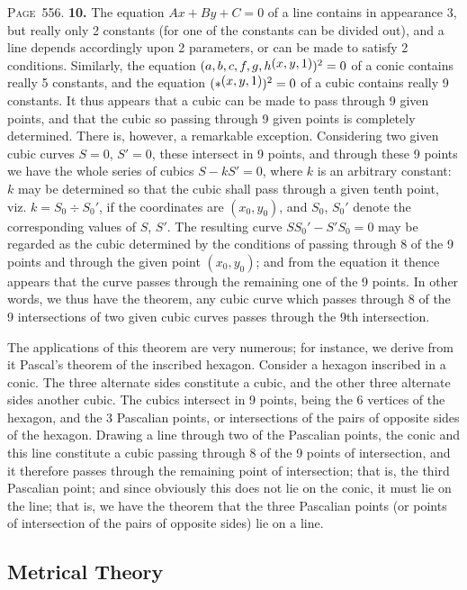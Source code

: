 \documentclass[11pt,a4paper]{book}
\begin{document}
\newpage
\noindent\textsc{Page~556.} \textbf{10.} The equation $Ax+By+C=0$ of a line contains in appearance 3, but really only 2 constants (for one of the constants can be divided out), and a line depends accordingly upon 2 parameters, or can be made to satisfy 2 conditions. Similarly, the equation $(a,b,c,f,g,h\,\raisebox{0.5ex}{\text{$\!(x,y,1)$}})^2=0$ of a conic contains really 5 constants, and the equation $(*\,\raisebox{0.5ex}{\text{$\!(x,y,1)$}})^2=0$ of a cubic contains really 9 constants. It thus appears that a cubic can be made to pass through 9 given points, and that the cubic so passing through 9 given points is completely determined. There is, however, a remarkable exception. Considering two given cubic curves $S=0$, $S'=0$, these intersect in 9 points, and through these 9 points we have the whole series of cubics $S-kS'=0$, where $k$ is an arbitrary constant: $k$ may be determined so that the cubic shall pass through a given tenth point, viz. $k=S_0\div S_0'$, if the coordinates are $(x_0,y_0)$, and $S_0$, $S_0'$ denote the corresponding values of $S$, $S'$. The resulting curve $SS_0'-S'S_0=0$ may be regarded as the cubic determined by the conditions of passing through 8 of the 9 points and through the given point $(x_0,y_0)$; and from the equation it thence appears that the curve passes through the remaining one of the 9 points. In other words, we thus have the theorem, any cubic curve which passes through 8 of the 9 intersections of two given cubic curves passes through the 9th intersection.

The applications of this theorem are very numerous; for instance, we derive from it Pascal's theorem of the inscribed hexagon. Consider a hexagon inscribed in a conic. The three alternate sides constitute a cubic, and the other three alternate sides another cubic. The cubics intersect in 9 points, being the 6 vertices of the hexagon, and the 3 Pascalian points, or intersections of the pairs of opposite sides of the hexagon. Drawing a line through two of the Pascalian points, the conic and this line constitute a cubic passing through 8 of the 9 points of intersection, and it therefore passes through the remaining point of intersection; that is, the third Pascalian point; and since obviously this does not lie on the conic, it must lie on the line; that is, we have the theorem that the three Pascalian points (or points of intersection of the pairs of opposite sides) lie on a line.

\subsection*{Metrical Theory}
\end{document}
